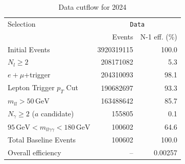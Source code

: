 \begin{table}[htbp]
\centering
\caption{Data cutflow for 2024}
\label{tab:cutflow-data-2024}
\footnotesize
\begin{tabular}{lrr}
\hline
Selection & \multicolumn{2}{c}{\texttt{Data}} \\
 & Events & N-1 eff. (\%) \\
\hline
Initial Events & 3920319115 & 100.0 \\
$N_{l}\geq 2$ & 208171082 & 5.3 \\
$e+\mu$+trigger & 204310093 & 98.1 \\
Lepton Trigger $p_T$ Cut & 190682697 & 93.3 \\
$m_{ll} > 50\,\mathrm{GeV}$ & 163488642 & 85.7 \\
$N_{\gamma}\geq 2$ ($a$ candidate) & 155805 & 0.1 \\
$95\,\mathrm{GeV} < m_{ll\gamma\gamma} < 180\,\mathrm{GeV}$ & 100602 & 64.6 \\
Total Baseline Events & 100602 & 100.0 \\
\hline
Overall efficiency & -- & 0.00257 \\
\hline
\end{tabular}
\end{table}

